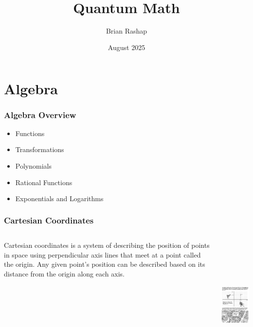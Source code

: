 \documentclass{beamer}
\begin{document}
\title{Quantum Math}
\author{Brian Rashap}
\date{August 2025} 



\begin{frame}
\titlepage
\end{frame}

\section{Algebra}
\begin{frame}\frametitle{Algebra Overview}
\begin{itemize}
\item Functions
\item Transformations
\item Polynomials
\item Rational Functions
\item Exponentials and Logarithms
\end{itemize}
\end{frame}

\begin{frame}\frametitle{Cartesian Coordinates}
\begin{columns}
\begin{column}{4cm}
Cartesian coordinates is a system of describing the position of points in space using perpendicular axis lines that meet at a point called the origin. Any given point’s position can be described based on its distance from the origin along each axis.
\end{column}
\begin{column}{6cm}
\begin{center}
\includegraphics[height=7cm]{fig/plotting.jpg}
\end{center}
\end{column}
\end{columns}
\end{frame}
\end{document}
